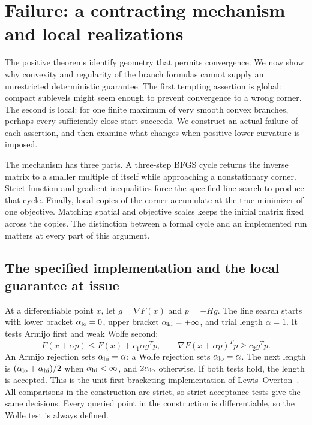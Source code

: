 \section{Failure: a contracting mechanism and local realizations}
\label{art:failure}

The positive theorems identify geometry that permits convergence. We now show
why convexity and regularity of the branch formulas cannot supply an
unrestricted deterministic guarantee. The first tempting assertion is
global: compact sublevels might seem enough to prevent convergence to a wrong
corner. The second is local: for one finite maximum of very smooth convex
branches, perhaps every sufficiently close start succeeds. We construct an
actual failure of each assertion, and then examine what changes when positive
lower curvature is imposed.

The mechanism has three parts. A three-step BFGS cycle returns the inverse
matrix to a smaller multiple of itself while approaching a nonstationary
corner. Strict function and gradient inequalities force the specified line
search to produce that cycle. Finally, local copies of the corner accumulate
at the true minimizer of one objective. Matching spatial and objective scales
keeps the initial matrix fixed across the copies. The distinction between a
formal cycle and an implemented run matters at every part of this argument.

\subsection{The specified implementation and the local guarantee at issue}
At a differentiable point $x$, let $g=\nabla F(x)$ and $p=-Hg$.
The line search starts with lower bracket $\alpha_{\rm lo}=0$, upper bracket
$\alpha_{\rm hi}=+\infty$, and trial length $\alpha=1$. It tests Armijo first and weak
Wolfe second:
\begin{equation}\label{art:failure_tests}
 F(x+\alpha p)\le F(x)+c_1\alpha g^Tp,
 \qquad \nabla F(x+\alpha p)^Tp\ge c_2g^Tp.
\end{equation}
An Armijo rejection sets $\alpha_{\rm hi}=\alpha$; a Wolfe rejection sets $\alpha_{\rm lo}=\alpha$.
The next length is $(\alpha_{\rm lo}+\alpha_{\rm hi})/2$ when $\alpha_{\rm hi}<\infty$, and $2\alpha_{\rm lo}$ otherwise.
If both tests hold, the length is accepted. This is the unit-first
bracketing implementation of Lewis--Overton~\cite[Algorithm~4.6]{LO}.
All comparisons in the construction are strict, so strict acceptance tests
give the same decisions.
Every queried point in the construction is differentiable, so the Wolfe test
is always defined.

